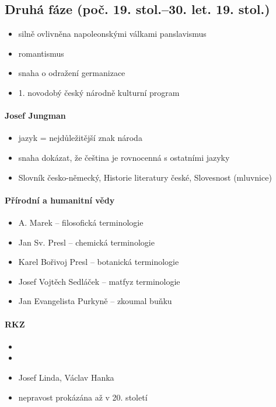 \subsection{Druhá fáze (poč. 19. stol.--30. let. 19. stol.)}
\begin{itemize}
\item silně ovlivněna napoleonskými válkami \ra panslavismus
\item romantismus
\item snaha o odražení germanizace 
\item 1. novodobý český národně kulturní program 
\end{itemize}

\paragraph{Josef Jungman}
\begin{itemize}
\item jazyk = nejdůležitější znak národa
\item snaha dokázat, že čeština je rovnocenná s ostatními jazyky
\item Slovník česko-německý, Historie literatury české, Slovesnost (mluvnice)
\end{itemize}

\paragraph{Přírodní a humanitní vědy}
\begin{itemize}
\item A. Marek -- filosofická terminologie
\item Jan Sv. Presl -- chemická terminologie
\item Karel Bořivoj Presl -- botanická terminologie
\item Josef Vojtěch Sedláček  -- matfyz terminologie
\item Jan Evangelista Purkyně -- zkoumal buňku
\end{itemize}

\paragraph{RKZ}
\begin{itemize}
\item {}
\item {}
\item Josef Linda, Václav Hanka
\item nepravost prokázána až v 20. století
\end{itemize}

